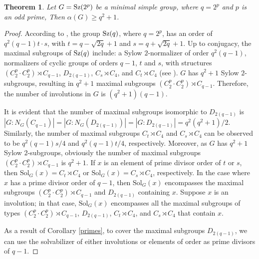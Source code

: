 \documentclass{amsart}
\newcommand{\Solv}{\text{Sol}}
\newtheorem{theorem}{Theorem}[section]
\theoremstyle{definition}
\theoremstyle{remark}
\begin{document}
\begin{theorem}
Let $G={\rm Sz}(2^p)$ be a minimal simple group, where $q=2^p$ and $p$ is an odd prime, Then $\alpha(G)\geq q^2+1$.
\end{theorem}
\begin{proof}
According to \cite[Theorem 4.1]{wilson}, the group ${\rm Sz}(q)$, where $q=2^p$, has an order of $q^2(q-1)t\cdot s$, with $t=q-\sqrt{2q}+1$ and $s=q+\sqrt{2q}+1$. Up to conjugacy, the maximal subgroups of ${\rm Sz}(q)$ include: a Sylow $2$-normalizer of order $q^2(q-1)$, normalizers of cyclic groups of orders $q-1$, $t$ and $s$, with structures $(C_2^p\cdot C_2^p)\rtimes C_{q-1}$, $D_{2(q-1)}$, $C_{s}\rtimes C_{4}$, and $C_{t}\rtimes C_{4}$ (see \cite{Bray}). $G$ has $q^2+1$ Sylow $2$-subgroups, resulting in $q^2+1$ maximal subgroups $(C_2^p\cdot C_2^p)\rtimes C_{q-1}$. Therefore, the number of involutions in $G$ is $(q^2+1)(q-1)$.

It is evident that the number of maximal subgroups isomorphic to $D_{2(q-1)}$ is  $|G:N_G(C_{q-1})|=|G:N_G(D_{2(q-1)})|=|G:D_{2(q-1)}|=q^2(q^2+1)/2$. Similarly, the number of maximal subgroups $C_t\rtimes C_{4}$ and $C_s\rtimes C_{4}$ can be observed to be $q^2(q-1)s/4$ and $q^2(q-1)t/4$, respectively. Moreover, as $G$ has $q^2+1$ Sylow $2$-subgroups, obviously the number of maximal subgroups $(C_2^p\cdot C_2^p)\rtimes C_{q-1}$ is $q^2+1$. If $x$ is an element of prime divisor order of $t$ or $s$, then $\Solv_G(x)=C_t\rtimes C_{4}$ or $\Solv_G(x)=C_s\rtimes C_{4}$, respectively. In the case where $x$ has a prime divisor order of $q-1$, then $\Solv_G(x)$ encompasses the maximal subgroups $(C_2^p\cdot C_2^p)\rtimes C_{q-1}$ and $D_{2(q-1)}$ containing $x$. Suppose $x$ is an involution; in that case, $\Solv_G(x)$ encompasses all the maximal subgroups of types $(C_2^p\cdot C_2^p)\rtimes C_{q-1}$, $D_{2(q-1)}$, $C_t\rtimes C_{4}$, and $C_s\rtimes C_{4}$ that contain $x$.

As a result of Corollary \ref{primes}, to cover the maximal subgroups $D_{2(q-1)}$, we can use the solvabilizer of either involutions or elements of order as prime divisors of $q-1$. 


\end{proof}
\end{document}
